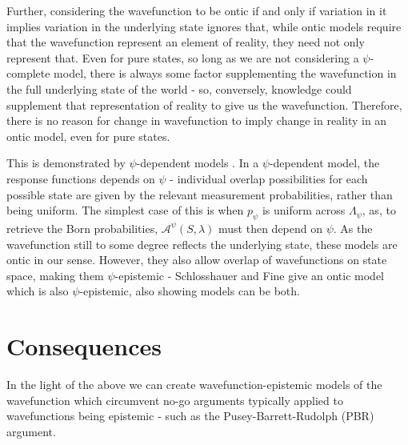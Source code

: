 \documentclass[superscriptaddress, floatfix,nofootinbib,12pt]{revtex4-2}
\begin{document}
Further, considering the wavefunction to be ontic if and only if variation in it implies variation in the underlying state ignores that, while ontic models require that the wavefunction represent an element of reality, they need not only represent that. Even for pure states, so long as we are not considering a $\psi$-complete model, there is always some factor supplementing the wavefunction in the full underlying state of the world - so, conversely, knowledge could supplement that representation of reality to give us the wavefunction. Therefore, there is no reason for change in wavefunction to imply change in reality in an ontic model, even for pure states.

This is demonstrated by $\psi$-dependent models \cite{Schlosshauer2012Implications}. In a $\psi$-dependent model, the response functions depends on $\psi$ - individual overlap possibilities for each possible state are given by the relevant measurement probabilities, rather than being uniform. The simplest case of this is when $p_\psi$ is uniform across $\Lambda_\psi$, as, to retrieve the Born probabilities, $\mathcal{A}^\psi(S,\lambda)$ must then depend on $\psi$. As the wavefunction still to some degree reflects the underlying state, these models are ontic in our sense. However, they also allow overlap of wavefunctions on state space, making them $\psi$-epistemic - Schlosshauer and Fine give an ontic model which is also $\psi$-epistemic, also showing models can be both.

\section{Consequences}

In the light of the above we can create wavefunction-epistemic models of the wavefunction which circumvent no-go arguments typically applied to wavefunctions being epistemic - such as the Pusey-Barrett-Rudolph (PBR) argument.
\end{document}
